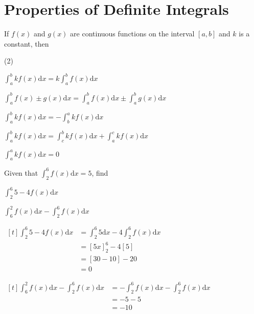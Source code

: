 \documentclass[11pt,a4paper]{book}
\begin{document}
\section{Properties of Definite Integrals}

\begin{tcolorbox}[colback=blue!5, colframe=black, boxrule=.4pt, sharpish corners]

If $f\left(x\right)$ and $g\left(x\right)$ are continuous functions
on the interval $\left[a,b\right]$ and $k$ is a constant, then

\begin{tasks}[style=itemize,label-width=3.5ex](2)

\task  ${\displaystyle \int_{a}^{b}kf(x)\mathrm{d}x=k\int_{a}^{b}f(x)\mathrm{d}x}$

\task  ${\displaystyle \int_{a}^{b}f(x)\pm g(x)\mathrm{d}x=\int_{a}^{b}f(x)\mathrm{d}x\pm\int_{a}^{b}g(x)\mathrm{d}x}$

\task  ${\displaystyle \int_{a}^{b}kf(x)\mathrm{d}x=-\int_{b}^{a}kf(x)\mathrm{d}x}$

\task  ${\displaystyle \int_{a}^{b}kf(x)\mathrm{d}x=\int_{c}^{b}kf(x)\mathrm{d}x+\int_{a}^{c}kf(x)\mathrm{d}x}$

\task  ${\displaystyle \int_{a}^{a}kf(x)\mathrm{d}x=0}$

\end{tasks}
\end{tcolorbox}

\begin{example}

Given that ${\displaystyle \int_{2}^{6}f(x)\mathrm{d}x=5}$, find

\begin{tasks}[label=(\alph*),label-width=3.5ex]

\task ${\displaystyle \int_{2}^{6}5-4f(x)\mathrm{d}x}$

\task ${\displaystyle \int_{6}^{2}f(x)\mathrm{d}x-\int_{2}^{6}f(x)\mathrm{d}x}$

\end{tasks}

\Solution

\begin{tasks}[label=(\alph*),label-width=3.5ex]

\task
$
\begin{aligned}[t]
{\displaystyle \int_{2}^{6}5-4f(x)\mathrm{d}x} & =\int_{2}^{6}5\mathrm{d}x-4\int_{2}^{6}f(x)\mathrm{d}x\\
 & =\left[5x\right]_{2}^{6}-4\left[5\right]\\
 & =[30-10]-20\\
 & =0
\end{aligned}
$

\task
$
\begin{aligned}[t]
{\displaystyle \int_{6}^{2}f(x)\mathrm{d}x-\int_{2}^{6}f(x)\mathrm{d}x} & =-\int_{2}^{6}f(x)\mathrm{d}x-\int_{2}^{6}f(x)\mathrm{d}x\\
 & =-5-5\\
 & =-10
\end{aligned}
$

\end{tasks}

\end{example}
\end{document}
